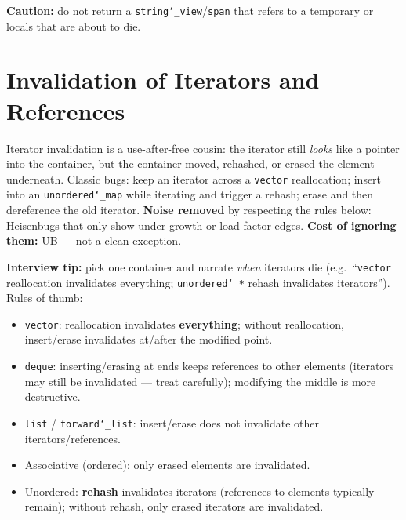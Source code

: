\textbf{Caution:} do not return a \texttt{string\char`_view}/\texttt{span} that refers to a 
temporary or locals that are about to die.

\newpage
\section{Invalidation of Iterators and References}
\label{sec:iterator-invalidation}
Iterator invalidation is a use-after-free cousin: the iterator still 
\emph{looks} like a pointer into the container, but the container moved, 
rehashed, or erased the element underneath. Classic bugs: keep an iterator 
across a \texttt{vector} reallocation; insert into an \texttt{unordered\char`_map} 
while iterating and trigger a rehash; erase and then dereference the old 
iterator.
\newline
\textbf{Noise removed} by respecting the rules below: Heisenbugs that only show 
under growth or load-factor edges. 
\textbf{Cost of ignoring them:} UB --- not a clean exception.
\par\noindent\textbf{Interview tip:} pick one container and narrate 
\emph{when} iterators die (e.g.\ ``\texttt{vector} reallocation invalidates 
everything; \texttt{unordered\char`_*} rehash invalidates iterators'').
\newline
Rules of thumb:
\begin{itemize}
    \item \texttt{vector}: reallocation invalidates \textbf{everything}; without reallocation, 
          insert/erase invalidates at/after the modified point.
    \item \texttt{deque}: inserting/erasing at ends keeps references to other elements 
          (iterators may still be invalidated --- treat carefully); modifying the middle 
          is more destructive.
    \item \texttt{list} / \texttt{forward\char`_list}: insert/erase does not invalidate other iterators/references.
    \item Associative (ordered): only erased elements are invalidated.
    \item Unordered: \textbf{rehash} invalidates iterators (references to elements typically remain); 
          without rehash, only erased iterators are invalidated.
\end{itemize}

